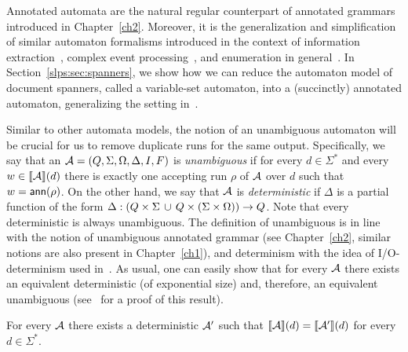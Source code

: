 Annotated automata are the natural regular counterpart of annotated grammars introduced in Chapter~\ref{ch2}. Moreover, it is the generalization and simplification of similar automaton formalisms introduced in the context of information extraction~\cite{FaginKRV15,Peterfreund21}, complex event processing~\cite{grez2021formal,GrezR20}, and enumeration in general~\cite{BourhisGJR21}. In Section~\ref{slps:sec:spanners}, we show how we can reduce the automaton model of document spanners, called a variable-set automaton, into a (succinctly) annotated automaton, generalizing the setting in~\cite{SchmidS21}. 

Similar to other automata models, the notion of an unambiguous automaton will be crucial for us to remove duplicate runs for the same output. 
Specifically, we say that an \rt $\mathcal{A} = (Q, \Sigma, \Omega, \Delta, I, F)$ is 
{\it unambiguous} if for every $d \in \Sigma^*$ and every $w \in {\llbracket{\mathcal{A}}\rrbracket}(d)$ there is exactly one accepting run $\rho$ of $\mathcal{A}$ over $d$ such that $w = \textsf{ann}(\rho)$. 
On the other hand, we say that $\mathcal{A}$ is \emph{deterministic} if $\Delta$ is a partial function of the form $\Delta: (Q \times \Sigma \, \cup\, Q\times (\Sigma\times\Omega)) \to Q$.
Note that every deterministic \rt is always unambiguous. 
The definition of unambiguous is in line with the notion of unambiguous annotated grammar (see Chapter~\ref{ch2}, similar notions are also present in Chapter~\ref{ch1}), and determinism with the idea of I/O-determinism used in~\cite{FlorenzanoRUVV20,BourhisGJR21,grez2021formal}.
As usual, one can easily show that for every \rt $\mathcal{A}$ there exists an equivalent deterministic \rt (of exponential size) and, therefore, an equivalent unambiguous \rt (see~\cite{FlorenzanoRUVV20,BourhisGJR21,grez2021formal} for a proof of this result). 
\begin{lemma}\label{slps:ra:det}
	For every \rtname $\mathcal{A}$ there exists a deterministic \rtname $\mathcal{A}'$ such that ${\llbracket{\mathcal{A}}\rrbracket}(d) = {\llbracket{\mathcal{A}'}\rrbracket}(d)$ for every $d\in\Sigma^*$.
\end{lemma}



